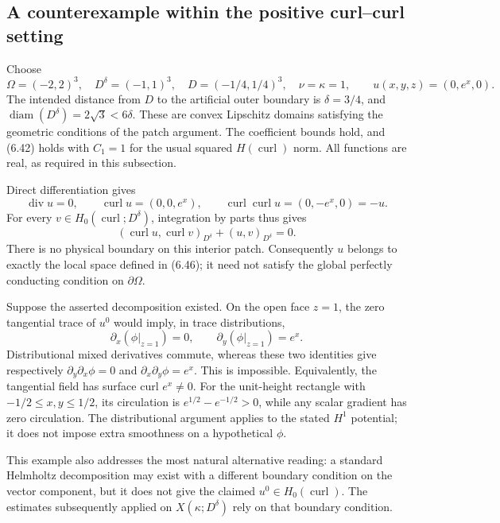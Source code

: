 \documentclass[10pt]{article}
\begin{document}
\subsection*{A counterexample within the positive curl–curl setting}
Choose \[\Omega=(-2,2)^3,\quad D^\delta=(-1,1)^3,\quad
 D=(-1/4,1/4)^3,\quad \nu=\kappa=1,
 \qquad u(x,y,z)=(0,e^x,0).\] The intended distance from \(D\) to the artificial outer boundary is \(\delta=3/4\), and \(\operatorname{diam}(D^\delta)=2\sqrt3<6\delta\). These are convex Lipschitz domains satisfying the geometric conditions of the patch argument. The coefficient bounds hold, and (6.42) holds with \(C_1=1\) for the usual squared \(H(\operatorname{curl})\) norm. All functions are real, as required in this subsection.\par
Direct differentiation gives \[\operatorname{div}u=0,\qquad
 \operatorname{curl}u=(0,0,e^x),\qquad
 \operatorname{curl}\operatorname{curl}u=(0,-e^x,0)=-u.\] For every \(v\in H_0(\operatorname{curl};D^\delta)\), integration by parts thus gives \[(\operatorname{curl}u,\operatorname{curl}v)_{D^\delta}+(u,v)_{D^\delta}=0.\] There is no physical boundary on this interior patch. Consequently \(u\) belongs to exactly the local space defined in (6.46); it need not satisfy the global perfectly conducting condition on \(\partial\Omega\).\par
Suppose the asserted decomposition existed. On the open face \(z=1\), the zero tangential trace of \(u^0\) would imply, in trace distributions, \[\partial_x(\phi|_{z=1})=0,\qquad
 \partial_y(\phi|_{z=1})=e^x.\] Distributional mixed derivatives commute, whereas these two identities give respectively \(\partial_y\partial_x\phi=0\) and \(\partial_x\partial_y\phi=e^x\). This is impossible. Equivalently, the tangential field has surface curl \(e^x\ne0\). For the unit-height rectangle with \(-1/2\le x,y\le1/2\), its circulation is \(e^{1/2}-e^{-1/2}>0\), while any scalar gradient has zero circulation. The distributional argument applies to the stated \(H^1\) potential; it does not impose extra smoothness on a hypothetical \(\phi\).\par
This example also addresses the most natural alternative reading: a standard Helmholtz decomposition may exist with a different boundary condition on the vector component, but it does not give the claimed \(u^0\in H_0(\operatorname{curl})\). The estimates subsequently applied on \(X(\kappa;D^\delta)\) rely on that boundary condition.\par
\end{document}
